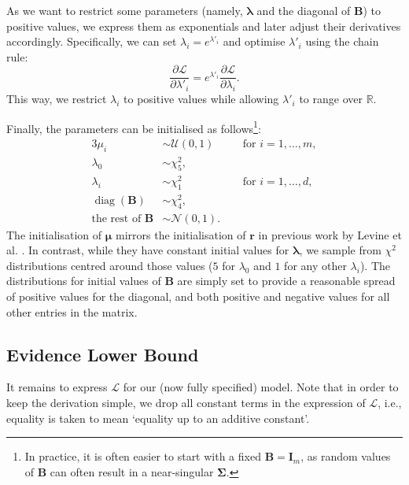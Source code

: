 \documentclass{mpaper}
\DeclareMathOperator{\diag}{diag}
\begin{document}
As we want to restrict some parameters (namely, $\bm\lambda$ and the diagonal of
$\mathbf{B}$) to positive values, we express them as exponentials and later
adjust their derivatives accordingly. Specifically, we can set $\lambda_i =
e^{\lambda'_i}$ and optimise $\lambda'_i$ using the chain rule:
\[
  \frac{\partial \mathcal{L}}{\partial \lambda'_i} = e^{\lambda'_i}
  \frac{\partial \mathcal{L}}{\partial \lambda_i}.
\]
This way, we restrict $\lambda_i$ to positive values while allowing $\lambda'_i$
to range over $\mathbb{R}$.

Finally, the parameters can be initialised as follows\footnote{In practice, it
  is often easier to start with a fixed $\mathbf{B} = \mathbf{I}_m$, as random
  values of $\mathbf{B}$ can often result in a near-singular $\bm\Sigma$.}:
\begin{alignat*}{3}
  \mu_i &\sim \mathcal{U}(0, 1) \quad &&\text{for } i = 1, \dots, m, \\
  \lambda_0 &\sim \chi^2_5, && \\
  \lambda_i &\sim \chi^2_1 \quad &&\text{for } i = 1, \dots, d, \\
  \diag(\mathbf{B}) &\sim \chi^2_4, && \\
  \text{the rest of } \mathbf{B} &\sim \mathcal{N}(0, 1). &&
\end{alignat*}
The initialisation of $\bm\mu$ mirrors the initialisation of $\mathbf{r}$ in
previous work by Levine et al. \cite{DBLP:conf/nips/LevinePK11}. In contrast,
while they have constant initial values for $\bm\lambda$, we sample from
$\chi^2$ distributions centred around those values ($5$ for $\lambda_0$ and $1$
for any other $\lambda_i$). The distributions for initial values of $\mathbf{B}$
are simply set to provide a reasonable spread of positive values for the
diagonal, and both positive and negative values for all other entries in the
matrix.

\subsection{Evidence Lower Bound} \label{sec:elbo}

It remains to express $\mathcal{L}$ for our (now fully specified) model. Note
that in order to keep the derivation simple, we drop all constant terms in the
expression of $\mathcal{L}$, i.e., equality is taken to mean `equality up to an
additive constant'.
\end{document}
